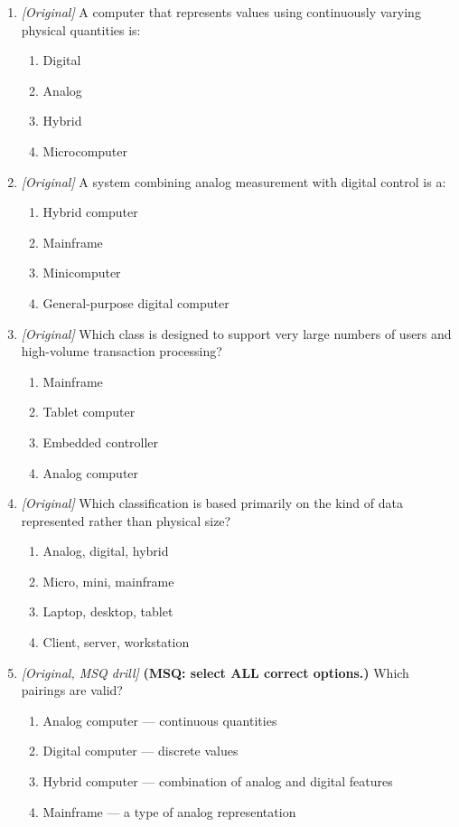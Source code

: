 \begin{enumerate}[label=\textbf{Q\arabic*.}, leftmargin=*]
\begin{enumerate}[label=\Alph*.]
    \item Supercomputer -- meant for routine office typing
  \end{enumerate}
\item \textit{[Original]} A computer that represents values using continuously varying physical quantities is:
  \begin{enumerate}[label=\Alph*.]
\item Digital
   \item Analog
   \item Hybrid
   \item Microcomputer
  \end{enumerate}

\item \textit{[Original]} A system combining analog measurement with digital control is a:
  \begin{enumerate}[label=\Alph*.]
\item Hybrid computer
   \item Mainframe
   \item Minicomputer
   \item General-purpose digital computer
  \end{enumerate}

\item \textit{[Original]} Which class is designed to support very large numbers of users and high-volume transaction processing?
  \begin{enumerate}[label=\Alph*.]
\item Mainframe
   \item Tablet computer
   \item Embedded controller
   \item Analog computer
  \end{enumerate}

\item \textit{[Original]} Which classification is based primarily on the kind of data represented rather than physical size?
  \begin{enumerate}[label=\Alph*.]
\item Analog, digital, hybrid
   \item Micro, mini, mainframe
   \item Laptop, desktop, tablet
   \item Client, server, workstation
  \end{enumerate}

\item \textit{[Original, MSQ drill]} \textbf{(MSQ: select ALL correct options.)} Which pairings are valid?
  \begin{enumerate}[label=\Alph*.]
\item Analog computer --- continuous quantities
   \item Digital computer --- discrete values
   \item Hybrid computer --- combination of analog and digital features
   \item Mainframe --- a type of analog representation
  \end{enumerate}

\end{enumerate}
